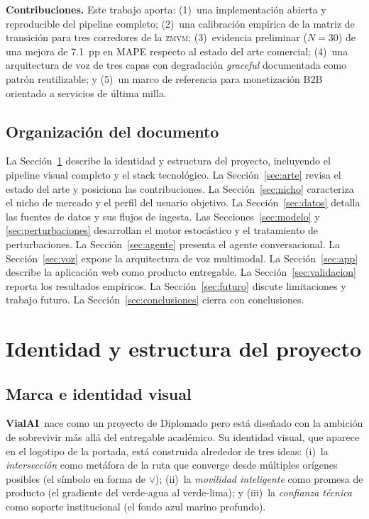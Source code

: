 \documentclass[11pt,a4paper]{article}
\newcommand{\VialAI}{\textbf{\textcolor{vialTeal}{Vial}\textcolor{vialAmber}{AI}}}
\newcommand{\ZMVM}{\textsc{zmvm}}
\begin{document}
\textbf{Contribuciones.} Este trabajo aporta: (1)~una
implementación abierta y reproducible del pipeline completo;
(2)~una calibración empírica de la matriz de transición para tres
corredores de la \ZMVM; (3)~evidencia preliminar ($N=30$) de una
mejora de \SI{7.1}{pp} en MAPE respecto al estado del arte
comercial; (4)~una arquitectura de voz de tres capas con
degradación \emph{graceful} documentada como patrón reutilizable;
y (5)~un marco de referencia para monetización B2B orientado a
servicios de última milla.

\subsection{Organización del documento}

La Sección~\ref{sec:identidad} describe la identidad y estructura
del proyecto, incluyendo el pipeline visual completo y el stack
tecnológico. La Sección~\ref{sec:arte} revisa el estado del arte
y posiciona las contribuciones. La Sección~\ref{sec:nicho}
caracteriza el nicho de mercado y el perfil del usuario objetivo.
La Sección~\ref{sec:datos} detalla las fuentes de datos y sus
flujos de ingesta. Las Secciones~\ref{sec:modelo} y
\ref{sec:perturbaciones} desarrollan el motor estocástico y el
tratamiento de perturbaciones. La Sección~\ref{sec:agente}
presenta el agente conversacional. La Sección~\ref{sec:voz}
expone la arquitectura de voz multimodal. La
Sección~\ref{sec:app} describe la aplicación web como producto
entregable. La Sección~\ref{sec:validacion} reporta los
resultados empíricos. La Sección~\ref{sec:futuro} discute
limitaciones y trabajo futuro. La Sección~\ref{sec:conclusiones}
cierra con conclusiones.

\section{Identidad y estructura del proyecto}
\label{sec:identidad}

\subsection{Marca e identidad visual}

\VialAI\ nace como un proyecto de Diplomado pero está diseñado con
la ambición de sobrevivir más allá del entregable académico. Su
identidad visual, que aparece en el logotipo de la portada, está
construida alrededor de tres ideas: (i)~la \emph{intersección}
como metáfora de la ruta que converge desde múltiples orígenes
posibles (el símbolo en forma de $\vee$); (ii)~la \emph{movilidad
inteligente} como promesa de producto (el gradiente del verde-agua
al verde-lima); y (iii)~la \emph{confianza técnica} como soporte
institucional (el fondo azul marino profundo).
\end{document}
